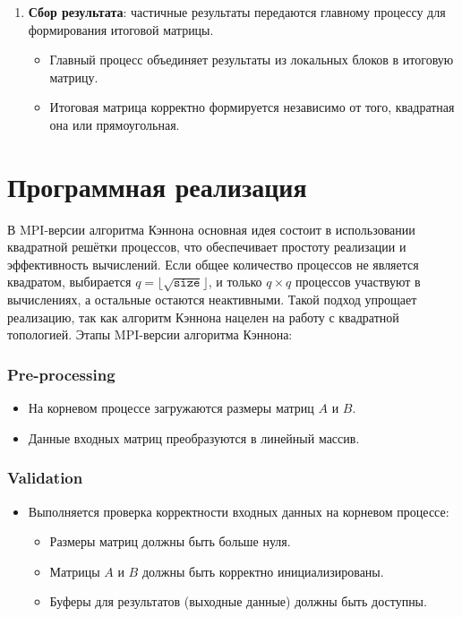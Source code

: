 \documentclass[12pt]{article}
\begin{document}
\begin{enumerate}
    \item \textbf{Сбор результата}: частичные результаты передаются главному процессу для формирования итоговой матрицы.
    \begin{itemize}
        \item Главный процесс объединяет результаты из локальных блоков в итоговую матрицу.
        \item Итоговая матрица корректно формируется независимо от того, квадратная она или прямоугольная.
    \end{itemize}
\end{enumerate}


\section{Программная реализация}

\hspace*{1.25em}В MPI-версии алгоритма Кэннона основная идея состоит в использовании квадратной решётки процессов, что обеспечивает простоту реализации и эффективность вычислений. Если общее количество процессов не является квадратом, выбирается $q = \lfloor \sqrt{\texttt{size}} \rfloor$, и только $q \times q$ процессов участвуют в вычислениях, а остальные остаются неактивными. Такой подход упрощает реализацию, так как алгоритм Кэннона нацелен на работу с квадратной топологией. Этапы MPI-версии алгоритма Кэннона:

\subsubsection*{Pre-processing}
\begin{itemize}
    \item На корневом процессе загружаются размеры матриц $A$ и $B$.
    \item Данные входных матриц преобразуются в линейный массив.
\end{itemize}

\subsubsection*{Validation}
\begin{itemize}
    \item Выполняется проверка корректности входных данных на корневом процессе:
    \begin{itemize}
        \item Размеры матриц должны быть больше нуля.
        \item Матрицы $A$ и $B$ должны быть корректно инициализированы.
        \item Буферы для результатов (выходные данные) должны быть доступны.
    \end{itemize}
\end{itemize}
\end{document}
